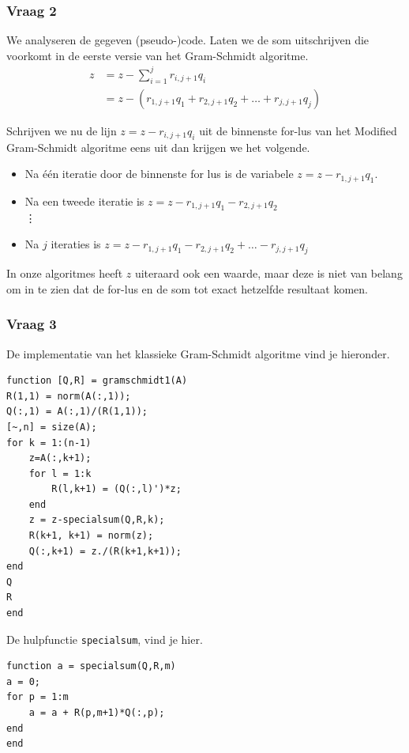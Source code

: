 \documentclass{article}
\begin{document}
\subsubsection*{Vraag 2}

We analyseren de gegeven (pseudo-)code. Laten we de som uitschrijven die voorkomt in de eerste versie van het Gram-Schmidt algoritme.
\begin{align*}
    z &= z - \sum_{i=1}^j r_{i,j+1}q_i \\
    &= z - (r_{1,j+1}q_1 + r_{2,j+1}q_2 + \dots + r_{j,j+1}q_j)
\end{align*}

Schrijven we nu de lijn $z=z-r_{i,j+1}q_i$ uit de binnenste for-lus van het Modified Gram-Schmidt algoritme eens uit dan krijgen we het volgende.
\begin{itemize}
\item Na \'e\'en iteratie door de binnenste for lus is de variabele $z = z - r_{1,j+1}q_1$.
\item Na een tweede iteratie is $z = z- r_{1,j+1}q_1 - r_{2,j+1}q_2$\\
\vdots
\vspace{-1mm}
\item Na $j$ iteraties is $z = z - r_{1,j+1}q_1 - r_{2,j+1}q_2 + \dots - r_{j,j+1}q_j$
\end{itemize}
In onze algoritmes heeft $z$ uiteraard ook een waarde, maar deze is niet van belang om in te zien dat de for-lus en de som tot exact hetzelfde resultaat komen.

\subsubsection*{Vraag 3}
De implementatie van het klassieke Gram-Schmidt algoritme vind je hieronder.
\vspace{-5mm}
\begin{lstlisting}
function [Q,R] = gramschmidt1(A)
R(1,1) = norm(A(:,1));
Q(:,1) = A(:,1)/(R(1,1));
[~,n] = size(A);
for k = 1:(n-1)
    z=A(:,k+1);
    for l = 1:k
        R(l,k+1) = (Q(:,l)')*z;
    end
    z = z-specialsum(Q,R,k);
    R(k+1, k+1) = norm(z);
    Q(:,k+1) = z./(R(k+1,k+1));
end
Q
R
end
\end{lstlisting}

De hulpfunctie \texttt{specialsum}, vind je hier.
\vspace{-5mm}
\begin{lstlisting}
function a = specialsum(Q,R,m)
a = 0;
for p = 1:m
    a = a + R(p,m+1)*Q(:,p);
end
end
\end{lstlisting}
\end{document}
